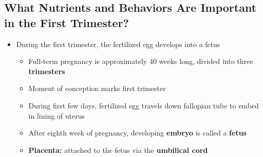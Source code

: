 \documentclass[12pt]{article}
\begin{document}
        \subsection{What Nutrients and Behaviors Are Important in the First Trimester?}
            \begin{itemize}
                \item During the first trimester, the fertilized egg develops into a fetus
                    \begin{itemize}
                        \item Full-term pregnancy is approximately 40 weeks long, divided into three \textbf{trimesters}
                        \item Moment of conception marks first trimester
                        \item During first few days, fertilized egg travels down fallopian tube to embed in lining of uterus
                        \item After eighth week of pregnancy, developing \textbf{embryo} is called a \textbf{fetus}
                        \item \textbf{Placenta:} attached to the fetus via the \textbf{umbilical cord}
                    \end{itemize}
            \end{itemize}
\end{document}
